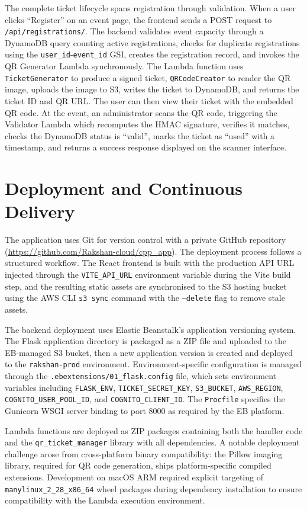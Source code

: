 \documentclass[conference]{IEEEtran}
\begin{document}
The complete ticket lifecycle spans registration through validation. When a user clicks ``Register'' on an event page, the frontend sends a POST request to \texttt{/api/registrations/}. The backend validates event capacity through a DynamoDB query counting active registrations, checks for duplicate registrations using the \texttt{user\_id}-\texttt{event\_id} GSI, creates the registration record, and invokes the QR Generator Lambda synchronously. The Lambda function uses \texttt{TicketGenerator} to produce a signed ticket, \texttt{QRCodeCreator} to render the QR image, uploads the image to S3, writes the ticket to DynamoDB, and returns the ticket ID and QR URL. The user can then view their ticket with the embedded QR code. At the event, an administrator scans the QR code, triggering the Validator Lambda which recomputes the HMAC signature, verifies it matches, checks the DynamoDB status is ``valid'', marks the ticket as ``used'' with a timestamp, and returns a success response displayed on the scanner interface.

\section{Deployment and Continuous Delivery}

The application uses Git for version control with a private GitHub repository (\url{https://github.com/Rakshan-cloud/cpp\_app}). The deployment process follows a structured workflow. The React frontend is built with the production API URL injected through the \texttt{VITE\_API\_URL} environment variable during the Vite build step, and the resulting static assets are synchronised to the S3 hosting bucket using the AWS CLI \texttt{s3 sync} command with the \texttt{--delete} flag to remove stale assets.

The backend deployment uses Elastic Beanstalk's application versioning system. The Flask application directory is packaged as a ZIP file and uploaded to the EB-managed S3 bucket, then a new application version is created and deployed to the \texttt{rakshan-prod} environment. Environment-specific configuration is managed through the \texttt{.ebextensions/01\_flask.config} file, which sets environment variables including \texttt{FLASK\_ENV}, \texttt{TICKET\_SECRET\_KEY}, \texttt{S3\_BUCKET}, \texttt{AWS\_REGION}, \texttt{COGNITO\_USER\_POOL\_ID}, and \texttt{COGNITO\_CLIENT\_ID}. The \texttt{Procfile} specifies the Gunicorn WSGI server binding to port 8000 as required by the EB platform.

Lambda functions are deployed as ZIP packages containing both the handler code and the \texttt{qr\_ticket\_manager} library with all dependencies. A notable deployment challenge arose from cross-platform binary compatibility: the Pillow imaging library, required for QR code generation, ships platform-specific compiled extensions. Development on macOS ARM required explicit targeting of \texttt{manylinux\_2\_28\_x86\_64} wheel packages during dependency installation to ensure compatibility with the Lambda execution environment.
\end{document}
